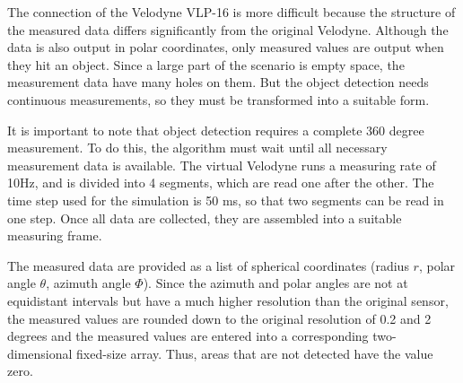 \documentclass[11pt,oneside,openright]{mpreport}
\begin{document}
The connection of the Velodyne VLP-16 is more difficult because the structure of the measured data differs significantly from the original Velodyne.
Although the data is also output in polar coordinates, only measured values are output when they hit an object. Since a large part of the scenario is empty space,
the measurement data have many holes on them. But the object detection needs continuous measurements, so they must be transformed into a suitable form.

It is important to note that object detection requires a complete 360 degree measurement. To do this, the algorithm must wait until all necessary measurement data is available.
The virtual Velodyne runs a measuring rate of 10Hz, and is divided into 4 segments, which are read one after the other. 
The time step used for the simulation is 50 ms, so that two segments can be read in one step. Once all data are collected, they are assembled into a suitable measuring frame.


The measured data are provided as a list of spherical coordinates (radius $r$, polar angle $\theta $, azimuth angle $\Phi$).
Since the azimuth and polar angles are not at equidistant intervals but have a much higher resolution than the original sensor,
the measured values are rounded down to the original resolution of 0.2 and 2 degrees and the measured values are entered into a corresponding two-dimensional fixed-size array.
Thus, areas that are not detected have the value zero.
\end{document}
